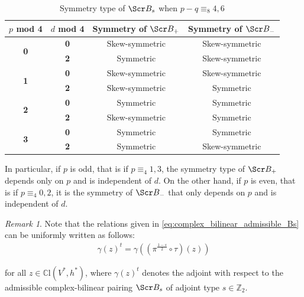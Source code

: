 \documentclass[10pt,a4paper,twoside,reqno]{amsart}
\theoremstyle{plain}
\theoremstyle{definition}
\theoremstyle{remark}
\newtheorem{remark}[thm]{Remark}
\def\Z{\mathbb{Z}}
\def\C{\mathbb{C}}
\def\scB{\Scr B}
\begin{document}
\begin{table}
\centering
\caption{Symmetry type of $\scB_{s}$ when $p-q \equiv_8 4,6$}
\label{tab:symmetry_grid_singleq_modified}
\renewcommand{\arraystretch}{1.3} %

\begin{tabular}{|c|c|c|c|}
\hline %
\textbf{$p$ mod 4} & \textbf{$d$ mod 4} & \textbf{Symmetry of $\scB_{+}$} & \textbf{Symmetry of $\scB_{-}$} \\ \hline %
\multirow{2}{*}{\textbf{0}} & \textbf{0} & Skew-symmetric & Skew-symmetric \\ \cline{2-4}
& \textbf{2} & Symmetric & Skew-symmetric \\ \hline
\multirow{2}{*}{\textbf{1}} & \textbf{0} & Skew-symmetric & Skew-symmetric \\ \cline{2-4}
& \textbf{2} & Skew-symmetric & Symmetric \\ \hline
\multirow{2}{*}{\textbf{2}} & \textbf{0} & Symmetric & Symmetric \\ \cline{2-4}
& \textbf{2} & Skew-symmetric & Symmetric \\ \hline
\multirow{2}{*}{\textbf{3}} & \textbf{0} & Symmetric & Symmetric \\ \cline{2-4}
& \textbf{2} & Symmetric & Skew-symmetric \\ \hline %
\end{tabular}
\end{table}

\noindent
In particular, if $p$ is odd, that is if $p \equiv_4 1,3$, the symmetry type of $\scB_{+}$ depends only on $p$ and is independent of $d$. On the other hand, if $p$ is even, that is if $p \equiv_4 0,2$, it is the symmetry of $\scB_{-}$ that only depends on $p$ and is independent of $d$. 

\begin{remark}
Note that the relations given in \eqref{eq:complex_bilinear_admissible_Bs} can be uniformly written as follows: 
\begin{eqnarray}
\label{eq:gamma_t}
\gamma(z)^t=\gamma((\pi^{\frac{1-s}{2}}\circ\tau)(z))    
\end{eqnarray}

\noindent
for all $z\in\C\mathrm{l}(V^*,h^*)$, where $\gamma(z)^t$ denotes the adjoint with respect to the admissible complex-bilinear pairing $\scB_s$ of adjoint type $s\in\Z_2$.
\end{remark}
\end{document}
